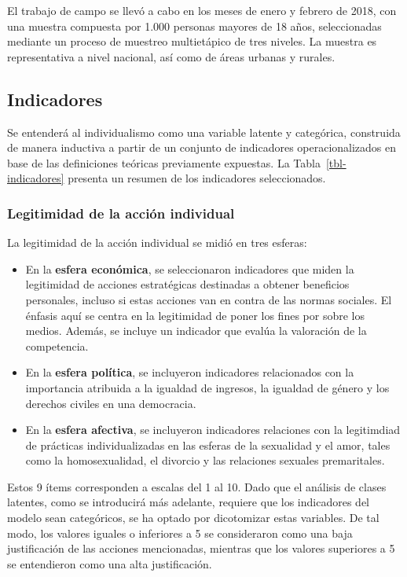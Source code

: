 \documentclass[
  12pt,
  letterpaper,
  DIV=11,
  numbers=noendperiod]{scrartcl}
\begin{document}
El trabajo de campo se llevó a cabo en los meses de enero y febrero de
2018, con una muestra compuesta por 1.000 personas mayores de 18 años,
seleccionadas mediante un proceso de muestreo multietápico de tres
niveles. La muestra es representativa a nivel nacional, así como de
áreas urbanas y rurales.

\subsection{Indicadores}\label{indicadores}

Se entenderá al individualismo como una variable latente y categórica,
construida de manera inductiva a partir de un conjunto de indicadores
operacionalizados en base de las definiciones teóricas previamente
expuestas. La Tabla~\ref{tbl-indicadores} presenta un resumen de los
indicadores seleccionados.

\subsubsection{Legitimidad de la acción
individual}\label{legitimidad-de-la-acciuxf3n-individual-1}

La legitimidad de la acción individual se midió en tres esferas:

\begin{itemize}
\item
  En la \textbf{esfera económica}, se seleccionaron indicadores que
  miden la legitimidad de acciones estratégicas destinadas a obtener
  beneficios personales, incluso si estas acciones van en contra de las
  normas sociales. El énfasis aquí se centra en la legitimidad de poner
  los fines por sobre los medios. Además, se incluye un indicador que
  evalúa la valoración de la competencia.
\item
  En la \textbf{esfera política}, se incluyeron indicadores relacionados
  con la importancia atribuida a la igualdad de ingresos, la igualdad de
  género y los derechos civiles en una democracia.
\item
  En la \textbf{esfera afectiva}, se incluyeron indicadores relaciones
  con la legitimdiad de prácticas individualizadas en las esferas de la
  sexualidad y el amor, tales como la homosexualidad, el divorcio y las
  relaciones sexuales premaritales.
\end{itemize}

Estos 9 ítems corresponden a escalas del 1 al 10. Dado que el análisis
de clases latentes, como se introducirá más adelante, requiere que los
indicadores del modelo sean categóricos, se ha optado por dicotomizar
estas variables. De tal modo, los valores iguales o inferiores a 5 se
consideraron como una baja justificación de las acciones mencionadas,
mientras que los valores superiores a 5 se entendieron como una alta
justificación.
\end{document}
